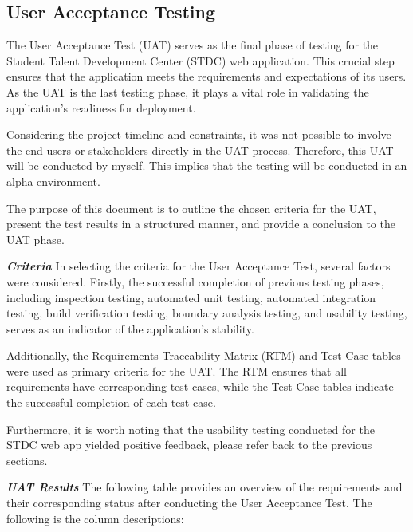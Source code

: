 \subsection{User Acceptance Testing}
\begin{justify}
The User Acceptance Test (UAT) serves as the final phase of testing for the Student Talent Development Center (STDC) web application. This crucial step ensures that the application meets the requirements and expectations of its users. As the UAT is the last testing phase, it plays a vital role in validating the application's readiness for deployment.

\vspace{0.25cm}
\newendline Considering the project timeline and constraints, it was not possible to involve the end users or stakeholders directly in the UAT process. Therefore, this UAT will be conducted by myself. This implies that the testing will be conducted in an alpha environment.

\vspace{0.25cm}
\newendline The purpose of this document is to outline the chosen criteria for the UAT, present the test results in a structured manner, and provide a conclusion to the UAT phase.

\vspace{0.25cm}
\newendline \textbf{\textit{Criteria}}\newendline
In selecting the criteria for the User Acceptance Test, several factors were considered. Firstly, the successful completion of previous testing phases, including inspection testing, automated unit testing, automated integration testing, build verification testing, boundary analysis testing, and usability testing, serves as an indicator of the application's stability.

\vspace{0.25cm}
\newendline Additionally, the Requirements Traceability Matrix (RTM) and Test Case tables were used as primary criteria for the UAT. The RTM ensures that all requirements have corresponding test cases, while the Test Case tables indicate the successful completion of each test case.

\vspace{0.25cm}
\newendline Furthermore, it is worth noting that the usability testing conducted for the STDC web app yielded positive feedback, please refer back to the previous sections.

\vspace{0.25cm}
\newendline \textbf{\textit{UAT Results}}\newendline
The following table provides an overview of the requirements and their corresponding status after conducting the User Acceptance Test. The following is the column descriptions:


\end{justify}
